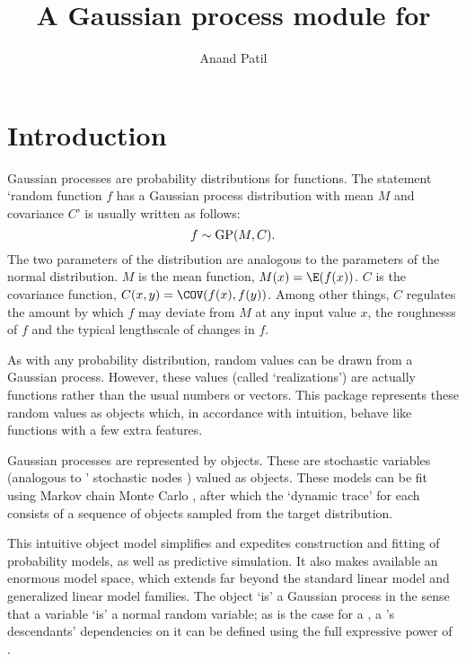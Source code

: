 \documentclass[article]{jss}
\author{Anand Patil}
\title{A Gaussian process module for \pkg{PyMC}}
\begin{document}
\maketitle

\tableofcontents


\section{Introduction}\label{sec:firstlook}

Gaussian processes are probability distributions for functions. The statement `random function $f$ has a Gaussian process distribution with mean $M$ and covariance $C$' is usually written as follows:
\begin{equation}
    f\sim\textup{GP}(M,C).
\end{equation}
The two parameters of the distribution are analogous to the parameters of the normal distribution. $M$ is the mean function, $M(x)=\E(f(x))$. $C$ is the covariance function, $C(x,y)=\COV(f(x),f(y))$. Among other things, $C$ regulates the amount by which $f$ may deviate from $M$ at any input value $x$, the roughnesss of $f$ and the typical lengthscale of changes in $f$.

As with any probability distribution, random values can be drawn from a Gaussian process. However, these values (called `realizations') are actually functions rather than the usual numbers or vectors. This package represents these random values as  objects which, in accordance with intuition, behave like  functions with a few extra features.

Gaussian processes are represented by  objects. These are  stochastic variables \citep{pymc} (analogous to ' stochastic nodes \citep{bugs}) valued as  objects. These models can be fit using Markov chain Monte Carlo \cite{gamerman}, after which the `dynamic trace' for each  consists of a sequence of  objects sampled from the target distribution. 

This intuitive object model simplifies and expedites construction and fitting of probability models, as well as predictive simulation. It also makes available an enormous model space, which extends far beyond the standard linear model and generalized linear model families. The  object `is' a Gaussian process in the sense that a   variable `is' a normal random variable; as is the case for a , a 's descendants' dependencies on it can be defined using the full expressive power of .
\end{document}
